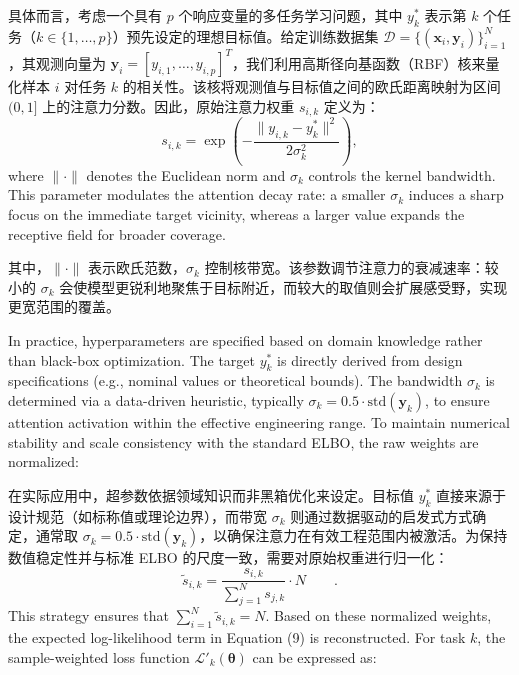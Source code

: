 \documentclass[11pt]{article}
\begin{document}
具体而言，考虑一个具有 $p$ 个响应变量的多任务学习问题，其中 $y_{k}^{*}$ 表示第 $k$ 个任务（$k \in \{1, \ldots, p\}$）预先设定的理想目标值。给定训练数据集 $\mathcal{D}=\{(\mathbf{x}_{i}, \mathbf{y}_{i})\}_{i=1}^{N}$，其观测向量为 $\mathbf{y}_{i}=[y_{i,1}, \ldots, y_{i,p}]^{T}$，我们利用高斯径向基函数（RBF）核来量化样本 $i$ 对任务 $k$ 的相关性。该核将观测值与目标值之间的欧氏距离映射为区间 $(0, 1]$ 上的注意力分数。因此，原始注意力权重 $s_{i,k}$ 定义为：
\begin{equation}
	{{s}_{i,k}}=\exp \left( -\frac{\|{{y}_{i,k}}-y_{k}^{*}{{\|}^{2}}}{2\sigma _{k}^{2}} \right),
\end{equation}
where $\|\cdot\|$ denotes the Euclidean norm and $\sigma_{k}$ controls the kernel bandwidth. This parameter modulates the attention decay rate: a smaller $\sigma_{k}$ induces a sharp focus on the immediate target vicinity, whereas a larger value expands the receptive field for broader coverage.

其中，$\|\cdot\|$ 表示欧氏范数，$\sigma_{k}$ 控制核带宽。该参数调节注意力的衰减速率：较小的 $\sigma_{k}$ 会使模型更锐利地聚焦于目标附近，而较大的取值则会扩展感受野，实现更宽范围的覆盖。

In practice, hyperparameters are specified based on domain knowledge rather than black-box optimization. The target $y_{k}^{*}$ is directly derived from design specifications (e.g., nominal values or theoretical bounds). The bandwidth $\sigma_{k}$ is determined via a data-driven heuristic, typically $\sigma_{k}=0.5 \cdot \text{std}(\mathbf{y}_{k})$, to ensure attention activation within the effective engineering range. To maintain numerical stability and scale consistency with the standard ELBO, the raw weights are normalized:

在实际应用中，超参数依据领域知识而非黑箱优化来设定。目标值 $y_{k}^{*}$ 直接来源于设计规范（如标称值或理论边界），而带宽 $\sigma_{k}$ 则通过数据驱动的启发式方式确定，通常取 $\sigma_{k}=0.5 \cdot \text{std}(\mathbf{y}_{k})$，以确保注意力在有效工程范围内被激活。为保持数值稳定性并与标准 ELBO 的尺度一致，需要对原始权重进行归一化：
\begin{equation}
	{{\tilde{s}}_{i,k}}=\frac{{{s}_{i,k}}}{\sum\limits_{j=1}^{N}{{{s}_{j,k}}}}\cdot N  \qquad .
\end{equation}
This strategy ensures that $\sum_{i=1}^{N} \tilde{s}_{i,k} = N$. Based on these normalized weights, the expected log-likelihood term in Equation (9) is reconstructed. For task $k$, the sample-weighted loss function $\mathcal{L}'_{k}(\boldsymbol{\theta})$ can be expressed as:
\end{document}
